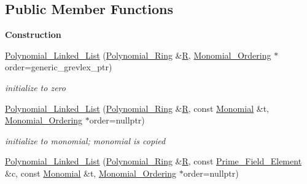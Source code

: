\subsection*{Public Member Functions}
\begin{Indent}\textbf{ Construction}\par
\begin{DoxyCompactItemize}
\item 
\mbox{\label{class_polynomial___linked___list_a78e2470c1632c6000b9fe3473055bcfd}} 
\hyperlink{class_polynomial___linked___list_a78e2470c1632c6000b9fe3473055bcfd}{Polynomial\+\_\+\+Linked\+\_\+\+List} (\hyperlink{class_polynomial___ring}{Polynomial\+\_\+\+Ring} \&\hyperlink{class_abstract___polynomial_a551ade20b7dcd96c227dd0401f6ffbbe}{R}, \hyperlink{class_monomial___ordering}{Monomial\+\_\+\+Ordering} $\ast$order=generic\+\_\+grevlex\+\_\+ptr)
\begin{DoxyCompactList}\small\item\em initialize to zero \end{DoxyCompactList}\item 
\mbox{\label{class_polynomial___linked___list_a4b930f7657f8909a9e573fb41085df5c}} 
\hyperlink{class_polynomial___linked___list_a4b930f7657f8909a9e573fb41085df5c}{Polynomial\+\_\+\+Linked\+\_\+\+List} (\hyperlink{class_polynomial___ring}{Polynomial\+\_\+\+Ring} \&\hyperlink{class_abstract___polynomial_a551ade20b7dcd96c227dd0401f6ffbbe}{R}, const \hyperlink{class_monomial}{Monomial} \&t, \hyperlink{class_monomial___ordering}{Monomial\+\_\+\+Ordering} $\ast$order=nullptr)
\begin{DoxyCompactList}\small\item\em initialize to monomial; monomial is copied \end{DoxyCompactList}\item 
\mbox{\label{class_polynomial___linked___list_a43326f9205d13f5f2b5e89c4679668f7}} 
\hyperlink{class_polynomial___linked___list_a43326f9205d13f5f2b5e89c4679668f7}{Polynomial\+\_\+\+Linked\+\_\+\+List} (\hyperlink{class_polynomial___ring}{Polynomial\+\_\+\+Ring} \&\hyperlink{class_abstract___polynomial_a551ade20b7dcd96c227dd0401f6ffbbe}{R}, const \hyperlink{class_prime___field___element}{Prime\+\_\+\+Field\+\_\+\+Element} \&c, const \hyperlink{class_monomial}{Monomial} \&t, \hyperlink{class_monomial___ordering}{Monomial\+\_\+\+Ordering} $\ast$order=nullptr)

\end{DoxyCompactItemize}
\end{Indent}
